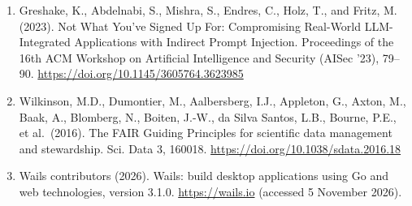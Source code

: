 \documentclass[11pt,a4paper]{article}
\begin{document}
\begin{enumerate}
  (accessed 5 November 2026).
\item
  Greshake, K., Abdelnabi, S., Mishra, S., Endres, C., Holz, T., and
  Fritz, M. (2023). Not What You've Signed Up For: Compromising
  Real-World LLM-Integrated Applications with Indirect Prompt Injection.
  Proceedings of the 16th ACM Workshop on Artificial Intelligence and
  Security (AISec '23), 79--90.
  \url{https://doi.org/10.1145/3605764.3623985}
\item
  Wilkinson, M.D., Dumontier, M., Aalbersberg, I.J., Appleton, G.,
  Axton, M., Baak, A., Blomberg, N., Boiten, J.-W., da Silva Santos,
  L.B., Bourne, P.E., et al.~(2016). The FAIR Guiding Principles for
  scientific data management and stewardship. Sci. Data 3, 160018.
  \url{https://doi.org/10.1038/sdata.2016.18}
\item
  Wails contributors (2026). Wails: build desktop applications using Go
  and web technologies, version 3.1.0. \url{https://wails.io} (accessed
  5 November 2026).
\end{enumerate}
\end{document}

